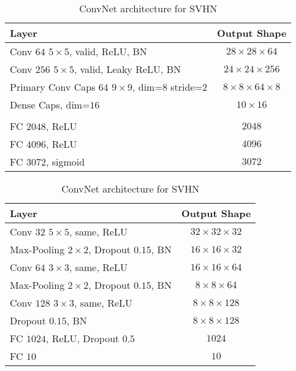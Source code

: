 \begin{table}
	\centering
	
	\begin{tabular}{lc}
		\toprule 
		Layer	& Output Shape \\ 
		\midrule 
		Conv $64$ $5\times5$, valid, ReLU, BN	&  $28\times28\times64$ \\ 
		\midrule 
		Conv $256$ $5\times5$, valid, Leaky ReLU, BN	&  $24\times24\times256$\\ 
		\midrule 
		Primary Conv Caps $64$ $9\times9$, dim=$8$	stride=$2$ &  $8\times8\times64\times8$\\ 
		\midrule 
		Dense Caps, dim=$16$	&  $10\times16$\\ 
		\midrule
		& \\
		\midrule
		FC $2048$, ReLU	& $2048$ \\
		\midrule
		FC $4096$, ReLU	& $4096$ \\
		\midrule
		FC $3072$, sigmoid	& $3072$\\
		\bottomrule
	\end{tabular}
	\caption{CapsNet architecture for SVHN}
	\label{tab:capsnet:svhn}
	
	\vspace{0.75cm}
	
	\begin{tabular}{lc}
		\toprule 
		Layer	&  Output Shape \\ 
		\midrule 
		Conv $32$ $5\times5$, same,	ReLU & $32\times32\times32$ \\ 
		\midrule 
		Max-Pooling $2\times2$, Dropout $0.15$, BN	&  $16\times16\times32$ \\ 
		\midrule 
		Conv $64$ $3\times3$, same, ReLU	& $16\times16\times64$ \\ 
		\midrule 
		Max-Pooling $2\times2$, Dropout $0.15$, BN	& $8\times8\times64$ \\
		\midrule
		Conv $128$ $3\times3$, same, ReLU	& $8\times8\times128$ \\
		\midrule
		Dropout $0.15$, BN	& $8\times8\times128$ \\
		\midrule
		FC $1024$, ReLU, Dropout $0.5$ & $1024$ \\
		\midrule
		FC $10$ & $10$\\
		\bottomrule
	\end{tabular}
	\caption{ConvNet architecture for SVHN}
	\label{tab:convnet:svhn}
\end{table}


